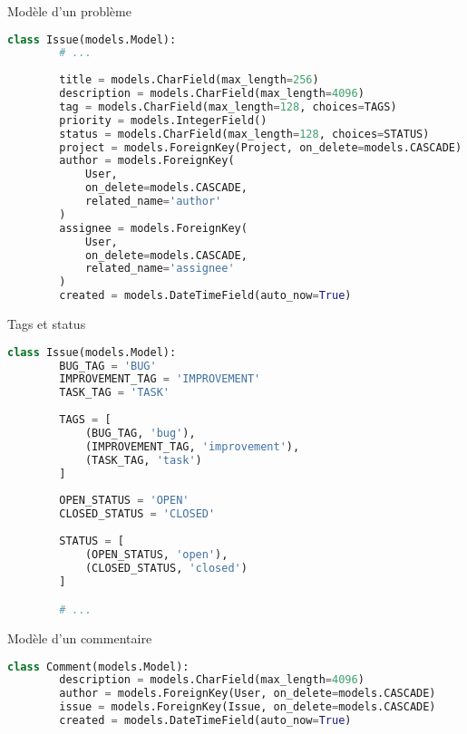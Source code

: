 \begin{frame}[fragile]{Modèle d'un problème}
  \begin{center}
    \tiny
    \begin{lstlisting}[language=python]
      class Issue(models.Model):
        # ...
      
        title = models.CharField(max_length=256)
        description = models.CharField(max_length=4096)
        tag = models.CharField(max_length=128, choices=TAGS)
        priority = models.IntegerField()
        status = models.CharField(max_length=128, choices=STATUS)
        project = models.ForeignKey(Project, on_delete=models.CASCADE)
        author = models.ForeignKey(
            User,
            on_delete=models.CASCADE,
            related_name='author'
        )
        assignee = models.ForeignKey(
            User,
            on_delete=models.CASCADE,
            related_name='assignee'
        )
        created = models.DateTimeField(auto_now=True)
    \end{lstlisting}
  \end{center}
\end{frame}

\begin{frame}[fragile]{Tags et status}
  \begin{center}
    \tiny
    \begin{lstlisting}[language=python]
      class Issue(models.Model):
        BUG_TAG = 'BUG'
        IMPROVEMENT_TAG = 'IMPROVEMENT'
        TASK_TAG = 'TASK'
        
        TAGS = [
            (BUG_TAG, 'bug'),
            (IMPROVEMENT_TAG, 'improvement'),
            (TASK_TAG, 'task')
        ]
        
        OPEN_STATUS = 'OPEN'
        CLOSED_STATUS = 'CLOSED'
        
        STATUS = [
            (OPEN_STATUS, 'open'),
            (CLOSED_STATUS, 'closed')
        ]

        # ...
    \end{lstlisting}
  \end{center}
\end{frame}

\begin{frame}[fragile]{Modèle d'un commentaire}
  \begin{center}
    \tiny
    \begin{lstlisting}[language=python]
      class Comment(models.Model):
        description = models.CharField(max_length=4096)
        author = models.ForeignKey(User, on_delete=models.CASCADE)
        issue = models.ForeignKey(Issue, on_delete=models.CASCADE)
        created = models.DateTimeField(auto_now=True)
    \end{lstlisting}
  \end{center}
\end{frame}


